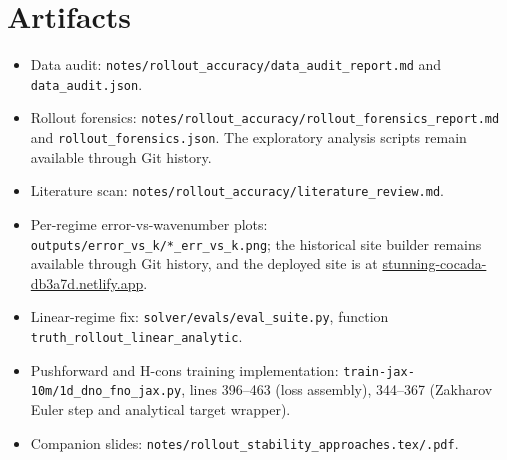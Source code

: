 \documentclass[11pt,letterpaper]{article}
\begin{document}
\section*{Artifacts}

\begin{itemize}[leftmargin=1.3em,itemsep=1pt]
  \item Data audit: \texttt{notes/rollout\_accuracy/data\_audit\_report.md}
        and \texttt{data\_audit.json}.
  \item Rollout forensics:
        \texttt{notes/rollout\_accuracy/rollout\_forensics\_report.md}
        and \texttt{rollout\_forensics.json}. The exploratory analysis scripts
        remain available through Git history.
  \item Literature scan:
        \texttt{notes/rollout\_accuracy/literature\_review.md}.
  \item Per-regime error-vs-wavenumber plots:
        \texttt{outputs/error\_vs\_k/*\_err\_vs\_k.png}; the historical site
        builder remains available through Git history, and the deployed site is
        at \href{https://stunning-cocada-db3a7d.netlify.app}{stunning-cocada-db3a7d.netlify.app}.
  \item Linear-regime fix:
        \texttt{solver/evals/eval\_suite.py}, function
        \texttt{truth\_rollout\_linear\_analytic}.
  \item Pushforward and H-cons training implementation:
        \texttt{train-jax-10m/1d\_dno\_fno\_jax.py}, lines 396--463
        (loss assembly), 344--367 (Zakharov Euler step and analytical
        target wrapper).
  \item Companion slides:
        \texttt{notes/rollout\_stability\_approaches.tex/.pdf}.
\end{itemize}
\end{document}
